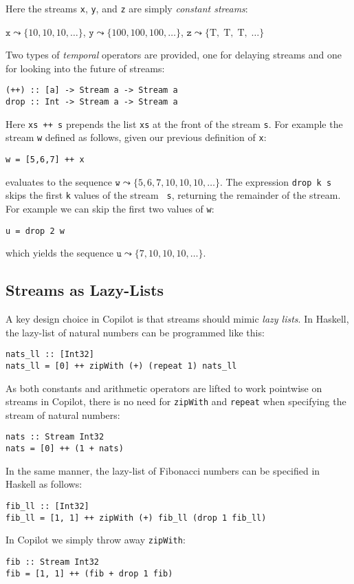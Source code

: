 \noindent Here the streams {\tt x}, {\tt y}, and {\tt z} are simply
\emph{constant streams}:

\begin{center}
$\mathtt{x} \leadsto \{10, 10, 10, \dots \}$,
$\mathtt{y} \leadsto \{100, 100, 100,  \dots \}$,
$\mathtt{z} \leadsto \{\mbox{T},\; \mbox{T},\; \mbox{T},\; \dots \}$
\end{center}

Two types of \emph{temporal} operators are provided, one for delaying streams and one for
looking into the future of streams:
%
\begin{lstlisting}[language = Copilot, frame = single]
(++) :: [a] -> Stream a -> Stream a
drop :: Int -> Stream a -> Stream a
\end{lstlisting}
%
Here {\tt xs ++ s} prepends the list {\tt xs} at the front of the stream {\tt s}.
For example the stream {\tt w} defined as follows, given our previous definition
of {\tt x}:
%
\begin{lstlisting}[language = Copilot, frame = single]
w = [5,6,7] ++ x
\end{lstlisting}
%
evaluates to the sequence
$\mathtt{w} \leadsto \{5, 6, 7, 10, 10, 10, \dots\}$.
The expression {\tt drop k s} skips the first {\tt k} values of the stream {\tt
  s}, returning the remainder of the stream.
For example we can skip the first two values of {\tt w}:
%
\begin{lstlisting}[language = Copilot, frame = single]
u = drop 2 w
\end{lstlisting}
%
which yields the sequence
$\mathtt{u} \leadsto \{7, 10, 10, 10, \dots\}$.

\subsection{Streams as Lazy-Lists} \label{sec:stream}

A key design choice in Copilot is that streams should mimic \emph{lazy lists}.
In Haskell, the lazy-list of natural numbers can be programmed like this:
%
\begin{lstlisting}[language = Copilot, frame = single]
nats_ll :: [Int32]
nats_ll = [0] ++ zipWith (+) (repeat 1) nats_ll
\end{lstlisting}
%
As both constants and arithmetic operators are lifted to work pointwise on
streams in Copilot, there is no need for {\tt zipWith} and {\tt repeat} when
specifying the stream of natural numbers:
%
\begin{lstlisting}[language = Copilot, frame = single]
nats :: Stream Int32
nats = [0] ++ (1 + nats)
\end{lstlisting}
%
In the same manner, the lazy-list of Fibonacci numbers can be specified  in Haskell as follows:
%
\begin{lstlisting}[language = Copilot, frame = single]
fib_ll :: [Int32]
fib_ll = [1, 1] ++ zipWith (+) fib_ll (drop 1 fib_ll)
\end{lstlisting}
%
In Copilot we simply throw away {\tt zipWith}:
\begin{lstlisting}[language = Copilot, frame = single]
fib :: Stream Int32
fib = [1, 1] ++ (fib + drop 1 fib)
\end{lstlisting}


